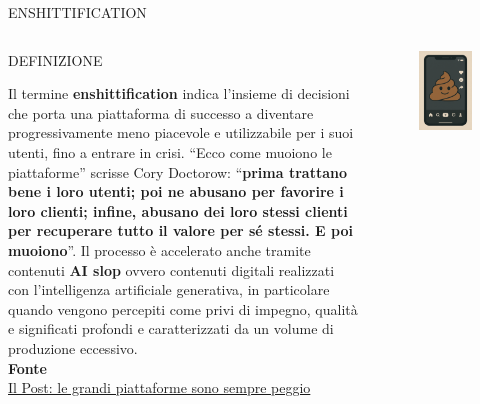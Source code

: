 \documentclass[aspectratio=1610]{beamer}
\begin{document}
\begin{frame}{ENSHITTIFICATION}
    \begin{columns}
            \begin{alertblock}{DEFINIZIONE}
                \begin{minipage}{0.96\linewidth}
                    \justifying
                    Il termine \textbf{enshittification} indica l’insieme di decisioni che porta 
                    una piattaforma di successo a diventare progressivamente meno piacevole e 
                    utilizzabile per i suoi utenti, fino a entrare in crisi. ``Ecco come muoiono 
                    le piattaforme'' scrisse Cory Doctorow: ``\textbf{prima trattano bene i loro utenti; poi ne 
                    abusano per favorire i loro clienti; infine, abusano dei loro stessi clienti 
                    per recuperare tutto il valore per sé stessi. E poi muoiono}''. 
                    Il processo è accelerato anche tramite contenuti \textbf{AI slop} ovvero 
                    contenuti digitali realizzati con l'intelligenza artificiale generativa, 
                    in particolare quando vengono percepiti come privi di impegno, qualità e 
                    significati profondi e caratterizzati da un volume di produzione eccessivo.\\
                    \bigskip
                    \tiny{\textbf{Fonte}}\\
                    \tiny{\href{https://www.ilpost.it/2023/08/03/enshittification/}{Il Post: le grandi piattaforme sono sempre peggio}}
                \end{minipage}
            \end{alertblock}
            \begin{figure}
                \includegraphics[width=.7\linewidth]{img/shit.png}

\end{figure}
\end{columns}
\end{frame}
\end{document}
